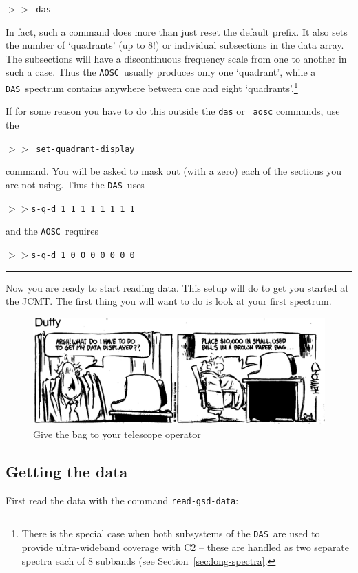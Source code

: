 \documentclass[11pt,twoside]{article}
\newcommand{\das}{{\tt DAS}}
\newcommand{\aosc}{{\tt AOSC}}
\newcommand{\SP}{{$>\!>$}}
\newcommand{\myline}
{\vspace*{-0.2in}\begin{center}\rule{3.0in}{0.015in}\end{center}}
\begin{document}
\SP\ {\tt das}

In fact, such a command does more than just reset the default prefix. It
also sets the number of `quadrants' (up to 8!) or individual subsections
in the data array. The subsections will have a discontinuous frequency
scale from one to another in such a case. Thus the \aosc\ usually produces
only one `quadrant', while a \das\ spectrum contains anywhere between one
and eight `quadrants'.\footnote{There is the special case when both
subsystems of the \das\ are used to provide ultra-wideband coverage with
C2 -- these are handled as two separate spectra each of 8 subbands (see
Section~\ref{sec:long-spectra}.}

If for some reason you have to do this outside the {\tt das} or {\tt
aosc} commands, use the

\SP\ {\tt set-quadrant-display}

command. You will be asked to mask out (with a zero) each of the sections you
are not using. Thus the \das\ uses

\SP {\tt s-q-d 1 1 1 1 1 1 1 1}

and the \aosc\ requires

\SP {\tt s-q-d 1 0 0 0 0 0 0 0}
\myline

Now you are ready to start reading data. This setup will do to get you
started at the JCMT. The first thing you will want to do is look at
your first spectrum.

\begin{figure}[htb]
\centering
\includegraphics[width=6.0in]{sc8_duffy.ps}
\vspace*{-0.5cm}
\begin{center}
\begin{minipage}[t]{5.5in}
\caption[Getting plots out]
{\small{Give the bag to your telescope operator}}
\label{fig:duffy}
\end{minipage}
\end{center}
\end{figure}

\subsection{Getting the data}
\label{sec:getting-the-data}
First read the data with the command {\tt read-gsd-data}:
\end{document}
